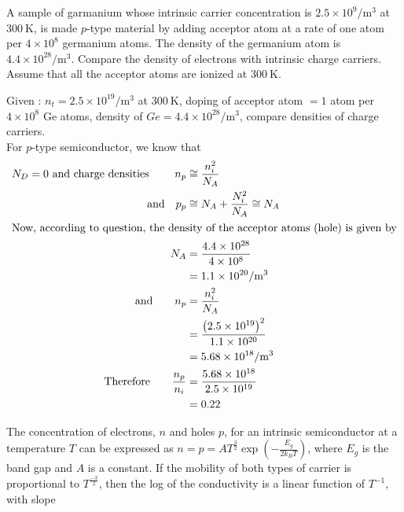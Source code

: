 \begin{enumerate}[label=\color{futuringtheme}\textbf{\arabic*.}]
	\item
		A sample of garmanium whose intrinsic carrier concentration is $2.5 \times 10^{9} / \mathrm{m}^{3}$ at $300 \mathrm{~K}$, is made $p$-type material by adding acceptor atom at a rate of one atom per $4 \times 10^{8}$ germanium atoms. The density of the germanium atom is $4.4 \times 10^{28} / \mathrm{m}^{3}$. Compare the density of electrons with intrinsic charge carriers. Assume that all the acceptor atoms are ionized at $300 \mathrm{~K}$.

	\begin{answer}
		Given : $n_{t}=2.5 \times 10^{19} / \mathrm{m}^{3}$ at $300 \mathrm{~K}$, doping of acceptor atom $=1$ atom per $4 \times 10^{8}$ Ge atoms, density of $G e=4.4 \times 10^{28} / \mathrm{m}^{3}$, compare densities of charge carriers.\\
		For $p$-type semiconductor, we know that
		\begin{align*}
		N_{D}=0 \text { and charge densities }\qquad n_{p} &\cong \frac{n_{i}^{2}}{N_{A}}\\
		\text{and}\quad p_{p} &\cong N_{A}+\frac{N_{i}^{2}}{N_{A}} \cong N_{A}\\
		\intertext{Now, according to question, the density of the acceptor atoms (hole) is given by}
		N_{A} &=\frac{4.4 \times 10^{28}}{4 \times 10^{8}} \\
		&=1.1 \times 10^{20} / \mathrm{m}^{3} \\
		\text{and}\qquad n_{p} &=\frac{n_{i}^{2}}{N_{A}} \\
		&=\frac{\left(2.5 \times 10^{19}\right)^{2}}{1.1 \times 10^{20}} \\
		&=5.68 \times 10^{18} / \mathrm{m}^{3} \\
		\text{Therefore}\qquad \frac{n_{p}}{n_{i}} &=\frac{5.68 \times 10^{18}}{2.5 \times 10^{19}} \\
		&=0.22
		\end{align*}
	\end{answer}
	\begin{minipage}{\textwidth}
		\item The concentration of electrons, $n$ and holes $p$, for an intrinsic semiconductor at a temperature $T$ can be expressed as $n=p=A T^{\frac{3}{2}} \exp \left(-\frac{E_{g}}{2 k_{B} T}\right)$, where $E_{g}$ is the band gap and $A$ is a constant. If the mobility of both types of carrier is proportional to $T^{\frac{-3}{2}}$, then the log of the conductivity is a linear function of $T^{-1}$, with slope

\end{minipage}
\end{enumerate}
